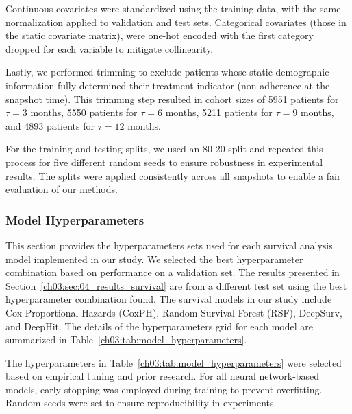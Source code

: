 Continuous covariates were standardized using the training data, with the same normalization applied to validation and test sets.
Categorical covariates (those in the static covariate matrix), were one-hot encoded with the first category dropped for each variable to mitigate collinearity.

Lastly, we performed trimming to exclude patients whose static demographic information fully determined their treatment indicator (non-adherence at the snapshot time).
This trimming step resulted in cohort sizes of 5951 patients for \(\tau=3\) months, 5550 patients for \(\tau=6\) months, 5211 patients for \(\tau=9\) months, and 4893 patients for \(\tau=12\) months.

For the training and testing splits, we used an 80-20 split and repeated this process for five different random seeds to ensure robustness in experimental results.
The splits were applied consistently across all snapshots to enable a fair evaluation of our methods.

\subsubsection{Model Hyperparameters}
\label{ch03:apd:model_hyperparams}

This section provides the hyperparameters sets used for each survival analysis model implemented in our study.
We selected the best hyperparameter combination based on performance on a validation set.
The results presented in Section~\ref{ch03:sec:04_results_survival} are from a different test set using the best hyperparameter combination found.
The survival models in our study include Cox Proportional Hazards (CoxPH), Random Survival Forest (RSF), DeepSurv, and DeepHit.
The details of the hyperparameters grid for each model are summarized in Table~\ref{ch03:tab:model_hyperparameters}.





The hyperparameters in Table~\ref{ch03:tab:model_hyperparameters} were selected based on empirical tuning and prior research.
For all neural network-based models, early stopping was employed during training to prevent overfitting.
Random seeds were set to ensure reproducibility in experiments.



